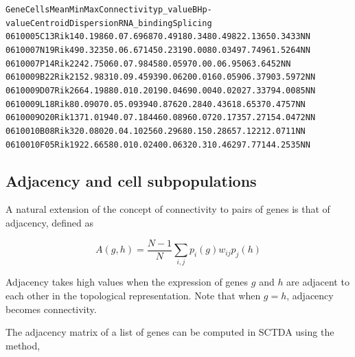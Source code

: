 \documentclass[letterpaper,10pt,english]{/usr/share/sphinx/texinputs/sphinxhowto}
\newenvironment{InvisibleVerbatim}
        {\begin{mdframed}[leftmargin=0.1\linewidth,innerleftmargin=3pt,innerrightmargin=3pt, userdefinedwidth=1\linewidth, linewidth=0pt, linecolor=white, usetwoside=false]}
        {\end{mdframed}}
\begin{document}
                \begin{InvisibleVerbatim}
\begin{alltt}{\tiny      Gene     Cells     Mean    Min     Max  Connectivity p\_value BH p-value Centroid Dispersion RNA\_binding Splicing
0610005C13Rik   14      0.1986   0.0   7.69687   0.4918     0.348    0.4982    2.1365    0.3433        N         N
0610007N19Rik   49      0.3235   0.0   6.67145   0.2319     0.008    0.0349    7.7496    1.5264        N         N
0610007P14Rik   224     2.7506   0.0   7.98458   0.0597     0.0      0.0       6.9506    3.6452        N         N
0610009B22Rik   215     2.9831   0.0   9.45939   0.0620     0.016    0.0590    6.3790    3.5972        N         N
0610009D07Rik   266     4.1988   0.0   10.2019   0.0469     0.004    0.0202    7.3379    4.0085        N         N
0610009L18Rik   8       0.0907   0.0   5.09394   0.8762     0.284    0.4361    8.6537    0.4757        N         N
0610009O20Rik   137     1.0194   0.0   7.18446   0.0896     0.072    0.1735    7.2715    4.0472        N         N
0610010B08Rik   32      0.0802   0.0   4.10256   0.2968     0.15     0.2865    7.1221    2.0711        N         N
0610010F05Rik   192     2.6658   0.0   10.0240   0.0632     0.31     0.4629    7.7714    4.2535        N         N
}
\end{alltt}

            \end{InvisibleVerbatim}
            
        
    
\subsection{Adjacency and cell subpopulations}

A natural extension of the concept of connectivity to pairs of genes is
that of adjacency, defined as

\begin{equation*}
A(g,h) = \frac{N-1}{N}\sum_{i,j} p_i(g) w_{ij} p_j(h)
\end{equation*}

Adjacency takes high values when the expression of genes $g$ and $h$ are
adjacent to each other in the topological representation. Note that when
$g=h$, adjacency becomes connectivity.

The adjacency matrix of a list of genes can be computed in SCTDA using
the method,

\end{document}
